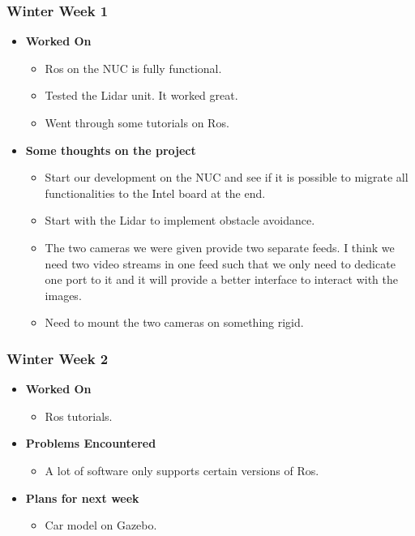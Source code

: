 \documentclass[compsoc,draftclsnofoot,onecolumn,10pt]{IEEEtran}
\begin{document}
\subsubsection{Winter Week 1}
\begin{itemize}
    \item {\textbf{Worked On}}
    \begin{itemize}
      \item Ros on the NUC is fully functional.
      \item Tested the Lidar unit. It worked great.
      \item Went through some tutorials on Ros.
    \end{itemize}

    \item {\textbf{Some thoughts on the project}}
    \begin{itemize}
      \item Start our development on the NUC and see if it is possible to
      migrate all functionalities to the Intel board at the end.
      \item Start with the Lidar to implement obstacle avoidance.
      \item The two cameras we were given provide two separate feeds. I
      think we need two video streams in one feed such that we only need to
      dedicate one port to it and it will provide a better interface to
      interact with the images.
      \item Need to mount the two cameras on something rigid.
    \end{itemize}

\end{itemize}

\subsubsection{Winter Week 2}
\begin{itemize}
    \item {\textbf{Worked On}}
    \begin{itemize}
      \item Ros tutorials.
    \end{itemize}

    \item {\textbf{Problems Encountered}}
    \begin{itemize}
      \item A lot of software only supports certain versions of Ros.
    \end{itemize}

    \item{\textbf{Plans for next week}}
    \begin{itemize}
      \item Car model on Gazebo.
    \end{itemize}

\end{itemize}
\end{document}
